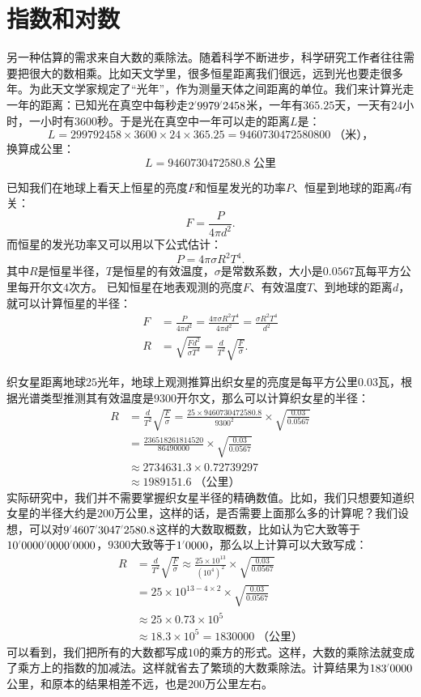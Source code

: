 \documentclass[12pt,UTF8]{ctexbook}
\begin{document}
\section{指数和对数}
另一种估算的需求来自大数的乘除法。随着科学不断进步，科学研究工作者往往需要把很大的数相乘。比如天文学里，很多恒星距离我们很远，远到光也要走很多年。为此天文学家规定了“光年”，作为测量天体之间距离的单位。我们来计算光走一年的距离：已知光在真空中每秒走$2\dlim{9979}\dlim{2458}$米，一年有$365.25$天，一天有$24$小时，一小时有$3600$秒。于是光在真空中一年可以走的距离$L$是：
$$ L = 299792458 \times 3600 \times 24 \times 365.25 = 9460730472580800 \; \mbox{（米），}$$
换算成公里：
$$ L = 9460730472580.8 \; \mbox{公里} $$

已知我们在地球上看天上恒星的亮度$F$和恒星发光的功率$P$、恒星到地球的距离$d$有关：
$$ F =  \frac{P}{4\pi d^2}. $$
而恒星的发光功率又可以用以下公式估计：
$$ P = 4\pi \sigma R^2 T^4. $$
其中$R$是恒星半径，$T$是恒星的有效温度，$\sigma$是常数系数，大小是$0.0567$瓦每平方公里每开尔文$4$次方。
已知恒星在地表观测的亮度$F$、有效温度$T$、到地球的距离$d$，就可以计算恒星的半径：
\begin{align*}
    F &= \frac{P}{4\pi d^2}=  \frac{4\pi \sigma R^2 T^4}{4\pi d^2} = \frac{\sigma R^2 T^4}{d^2} \\
    R &= \sqrt{\frac{Fd^2}{\sigma T^4}} = \frac{d}{T^2}\sqrt{\frac{F}{\sigma}}.
\end{align*}

织女星距离地球$25$光年，地球上观测推算出织女星的亮度是每平方公里$0.03$瓦，根据光谱类型推测其有效温度是$9300$开尔文，那么可以计算织女星的半径：
\begin{align*}
    R &= \frac{d}{T^2}\sqrt{\frac{F}{\sigma}} = \frac{25\times 9460730472580.8}{9300^2} \times \sqrt{\frac{0.03}{0.0567}} \\
    &= \frac{236518261814520}{86490000} \times \sqrt{\frac{0.03}{0.0567}} \\
    &\approx 2734631.3 \times 0.72739297\\
    &\approx 1989151.6 \; \mbox{（公里）}
\end{align*}
实际研究中，我们并不需要掌握织女星半径的精确数值。比如，我们只想要知道织女星的半径大约是$200$万公里，这样的话，是否需要上面那么多的计算呢？我们设想，可以对$9\dlim{4607}\dlim{3047}\dlim{2580}.8$这样的大数取概数，比如认为它大致等于$10\dlim{0000}\dlim{0000}\dlim{0000}$，$9300$大致等于$1\dlim{0000}$，那么以上计算可以大致写成：
\begin{align*}
    R &= \frac{d}{T^2}\sqrt{\frac{F}{\sigma}} \approx \frac{25 \times 10^{13}}{\left(10^4\right)^2} \times \sqrt{\frac{0.03}{0.0567}} \\
    &= 25\times 10^{13-4\times 2} \times \sqrt{\frac{0.03}{0.0567}} \\
    &\approx 25 \times 0.73 \times 10^{5}\\
    &\approx 18.3 \times 10^5 = 1830000 \; \mbox{（公里）}
\end{align*}
可以看到，我们把所有的大数都写成$10$的乘方的形式。这样，大数的乘除法就变成了乘方上的指数的加减法。这样就省去了繁琐的大数乘除法。计算结果为$183\dlim{0000}$公里，和原本的结果相差不远，也是$200$万公里左右。
\end{document}
